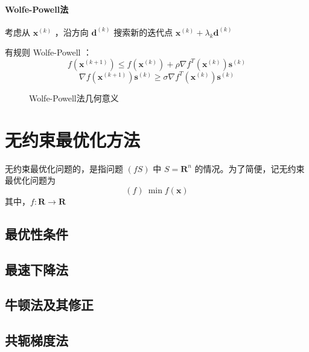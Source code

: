 \documentclass{book}
\begin{document}
\subsubsection{Wolfe-Powell法}

考虑从 $\boldsymbol{x}^{(k)}$ ，沿方向 $\boldsymbol{d}^{(k)}$ 搜索新的迭代点 $\boldsymbol{x}^{(k)}+\lambda_k\boldsymbol{d}^{(k)}$

有规则 Wolfe-Powell ：
\begin{equation}
    f(\boldsymbol{x}^{(k+1)})\le f(\boldsymbol{x}^{(k)})+\rho\nabla f^T(\boldsymbol{x}^{(k)})\boldsymbol{s}^{(k)}
    \label{equ:Wolfe-Powell rule 1}
\end{equation}
\begin{equation}
    \nabla f(\boldsymbol{x}^{(k+1)})\boldsymbol{s}^{(k)}\ge\sigma\nabla f^T(\boldsymbol{x}^{(k)})\boldsymbol{s}^{(k)}
    \label{equ:Wolfe-Powell rule 2}
\end{equation}


\begin{figure}[ht]
    \centering
    
    \caption{Wolfe-Powell法几何意义}
    \label{fig:Axis of Wolfe-Powell method}
\end{figure}

\chapter{无约束最优化方法}

无约束最优化问题的，是指问题 $(fS)$ 中 $S=\mathbf{R}^n$ 的情况。为了简便，记无约束最优化问题为
$$
    (f)\ \min f(\boldsymbol{x})
$$
其中，$f:\mathbf{R}\rightarrow\mathbf{R}$

\section{最优性条件}

\section{最速下降法}

\section{牛顿法及其修正}

\section{共轭梯度法}
\end{document}
